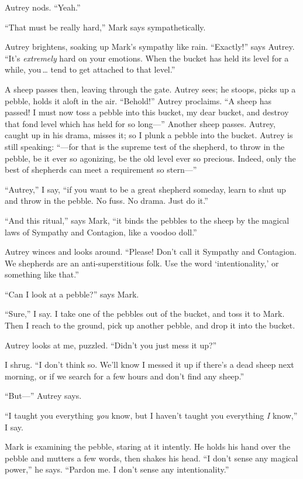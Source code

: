 {
 Autrey nods. ``Yeah.''}

{
 ``That must be really hard,''
Mark says sympathetically.}

{
 Autrey brightens, soaking up Mark's sympathy like
rain. ``Exactly!'' says Autrey.
``It's \textit{extremely} hard on your
emotions. When the bucket has held its level for a while, you\,\ldots
tend to get attached to that level.''}

{
 A sheep passes then, leaving through the gate. Autrey sees; he
stoops, picks up a pebble, holds it aloft in the air.
``Behold!'' Autrey proclaims.
``A sheep has passed! I must now toss a pebble into
this bucket, my dear bucket, and destroy that fond level which has held
for so long---'' Another sheep passes. Autrey, caught
up in his drama, misses it; so I plunk a pebble into the bucket. Autrey
is still speaking: ``---for that is the supreme test
of the shepherd, to throw in the pebble, be it ever so agonizing, be
the old level ever so precious. Indeed, only the best of shepherds can
meet a requirement so stern---''}

{
 ``Autrey,'' I say,
``if you want to be a great shepherd someday, learn to
shut up and throw in the pebble. No fuss. No drama. Just do
it.''}

{
 ``And this ritual,'' says Mark,
``it binds the pebbles to the sheep by the magical
laws of Sympathy and Contagion, like a voodoo
doll.''}

{
 Autrey winces and looks around. ``Please!
Don't call it Sympathy and Contagion. We shepherds are
an anti-superstitious folk. Use the word
`intentionality,' or something like
that.''}

{
 ``Can I look at a pebble?''
says Mark.}

{
 ``Sure,'' I say. I take one of
the pebbles out of the bucket, and toss it to Mark. Then I reach to the
ground, pick up another pebble, and drop it into the bucket.}

{
 Autrey looks at me, puzzled.
``Didn't you just mess it
up?''}

{
 I shrug. ``I don't think so.
We'll know I messed it up if there's a
dead sheep next morning, or if we search for a few hours and
don't find any sheep.''}

{
 ``But---'' Autrey says.}

{
 ``I taught you everything \textit{you} know, but
I haven't taught you everything \textit{I}
know,'' I say.}

{
 Mark is examining the pebble, staring at it intently. He holds his
hand over the pebble and mutters a few words, then shakes his head.
``I don't sense any magical
power,'' he says. ``Pardon me. I
don't sense any intentionality.''}

